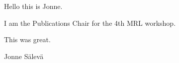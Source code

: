 Hello this is Jonne.

I am the Publications Chair for the 4th MRL workshop.

This was great.

Jonne S{\"a}lev{\"a}
